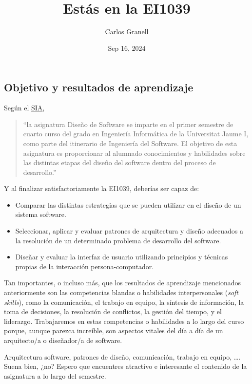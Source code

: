 \documentclass[
  letterpaper,
  DIV=11,
  numbers=noendperiod]{scrartcl}
\title{Estás en la EI1039}
\author{Carlos Granell}
\date{Sep 16, 2024}
\providecommand{\tightlist}{%
  \setlength{\itemsep}{0pt}\setlength{\parskip}{0pt}}\usepackage{longtable,booktabs,array}
\begin{document}
\maketitle


\subsection{Objetivo y resultados de
aprendizaje}\label{objetivo-y-resultados-de-aprendizaje}

Según el
\href{https://ujiapps.uji.es/sia/rest/publicacion/2025/estudio/225/asignatura/EI1039}{SIA},

\begin{quote}
``la asignatura Diseño de Software se imparte en el primer semestre de
cuarto curso del grado en Ingeniería Informática de la Universitat Jaume
I, como parte del itinerario de Ingeniería del Software. El objetivo de
esta asignatura es proporcionar al alumnado conocimientos y habilidades
sobre las distintas etapas del diseño del software dentro del proceso de
desarrollo.''
\end{quote}

Y al finalizar satisfactoriamente la EI1039, deberías ser capaz de:

\begin{itemize}
\tightlist
\item
  Comparar las distintas estrategias que se pueden utilizar en el diseño
  de un sistema software.
\item
  Seleccionar, aplicar y evaluar patrones de arquitectura y diseño
  adecuados a la resolución de un determinado problema de desarrollo del
  software.
\item
  Diseñar y evaluar la interfaz de usuario utilizando principios y
  técnicas propias de la interacción persona-computador.
\end{itemize}

Tan importantes, o incluso más, que los resultados de aprendizaje
mencionados anteriormente son las competencias blandas o habilidades
interpersonales (\emph{soft skills}), como la comunicación, el trabajo
en equipo, la síntesis de información, la toma de decisiones, la
resolución de conflictos, la gestión del tiempo, y el liderazgo.
Trabajaremos en estas competencias o habilidades a lo largo del curso
porque, aunque parezca increíble, son aspectos vitales del día a día de
un arquitecto/a o diseñador/a de software.

Arquitectura software, patrones de diseño, comunicación, trabajo en
equipo, \ldots. Suena bien, ¿no? Espero que encuentres atractivo e
interesante el contenido de la asignatura a lo largo del semestre.
\end{document}

